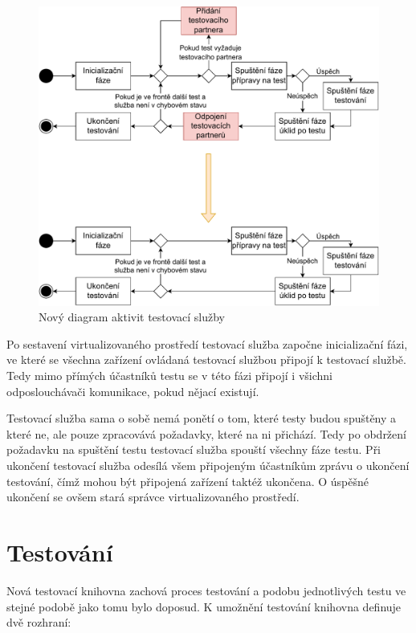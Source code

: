 \begin{figure}[htbp]
    \centering 
    \includegraphics[width=\textwidth]{assets/img/activitydiagramservicechange.pdf}
    \caption{Nový diagram aktivit testovací služby}
    \label{fig:activitydiagramservice}
\end{figure}

Po sestavení virtualizovaného prostředí testovací služba započne inicializační fázi, ve které se všechna zařízení ovládaná testovací službou připojí k testovací službě. Tedy mimo přímých účastníků testu se v této fázi připojí i všichni odposlouchávači komunikace, pokud nějací existují. 

Testovací služba sama o sobě nemá ponětí o tom, které testy budou spuštěny a které ne, ale pouze zpracovává požadavky, které na ni přichází. Tedy po obdržení požadavku na spuštění testu testovací služba spouští všechny fáze testu. Při ukončení testovací služba odesílá všem připojeným účastníkům zprávu o ukončení testování, čímž mohou být připojená zařízení taktéž ukončena. O úspěšné ukončení se ovšem stará správce virtualizovaného prostředí.


\section{Testování}

Nová testovací knihovna zachová proces testování a podobu jednotlivých testu ve stejné podobě jako tomu bylo doposud. K umožnění testování knihovna definuje dvě rozhraní:

